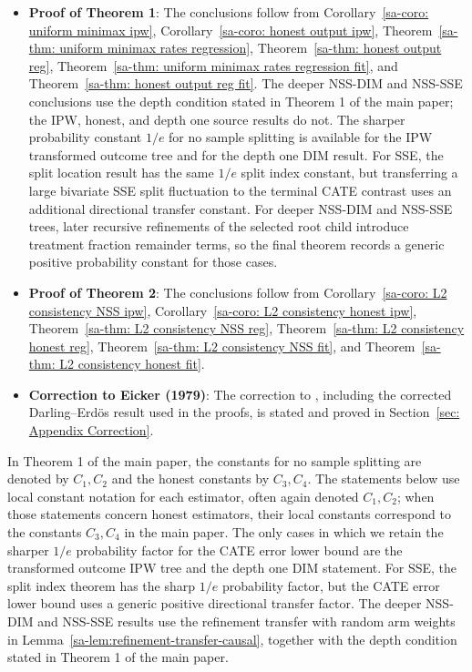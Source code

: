 \documentclass[10pt]{article}
\theoremstyle{definition}
\theoremstyle{remark}
\begin{document}
\begin{itemize}
    \item \textbf{Proof of Theorem 1}: The conclusions follow from Corollary~\ref{sa-coro: uniform minimax ipw}, Corollary~\ref{sa-coro: honest output ipw}, Theorem~\ref{sa-thm: uniform minimax rates regression}, Theorem~\ref{sa-thm: honest output reg}, Theorem~\ref{sa-thm: uniform minimax rates regression fit}, and Theorem~\ref{sa-thm: honest output reg fit}. The deeper NSS-DIM and NSS-SSE conclusions use the depth condition stated in Theorem 1 of the main paper; the IPW, honest, and depth one source results do not. The sharper probability constant $1/e$ for no sample splitting is available for the IPW transformed outcome tree and for the depth one DIM result. For SSE, the split location result has the same $1/e$ split index constant, but transferring a large bivariate SSE split fluctuation to the terminal CATE contrast uses an additional directional transfer constant. For deeper NSS-DIM and NSS-SSE trees, later recursive refinements of the selected root child introduce treatment fraction remainder terms, so the final theorem records a generic positive probability constant for those cases.

    \item \textbf{Proof of Theorem 2}: The conclusions follow from Corollary~\ref{sa-coro: L2 consistency NSS ipw}, Corollary~\ref{sa-coro: L2 consistency honest ipw}, Theorem~\ref{sa-thm: L2 consistency NSS reg}, Theorem~\ref{sa-thm: L2 consistency honest reg}, Theorem~\ref{sa-thm: L2 consistency NSS fit}, and Theorem~\ref{sa-thm: L2 consistency honest fit}.

    \item \textbf{Correction to Eicker (1979)}: The correction to \citet[Theorem 5]{eicker1979asymptotic}, including the corrected Darling--Erd\"os result used in the proofs, is stated and proved in Section~\ref{sec: Appendix Correction}.
\end{itemize}

In Theorem 1 of the main paper, the constants for no sample splitting are denoted by $C_1,C_2$ and the honest constants by $C_3,C_4$. The statements below use local constant notation for each estimator, often again denoted $C_1,C_2$; when those statements concern honest estimators, their local constants correspond to the constants $C_3,C_4$ in the main paper. The only cases in which we retain the sharper $1/e$ probability factor for the CATE error lower bound are the transformed outcome IPW tree and the depth one DIM statement. For SSE, the split index theorem has the sharp $1/e$ probability factor, but the CATE error lower bound uses a generic positive directional transfer factor. The deeper NSS-DIM and NSS-SSE results use the refinement transfer with random arm weights in Lemma~\ref{sa-lem:refinement-transfer-causal}, together with the depth condition stated in Theorem 1 of the main paper.
\end{document}
